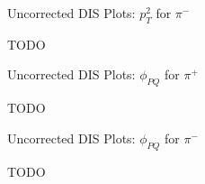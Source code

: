 \begin{frame}{Uncorrected DIS Plots: $p_T^2$ for $\pi^-$}
    \label{20.10f::pt2_pi-}

    TODO

\end{frame}

\begin{frame}{Uncorrected DIS Plots: $\phi_{PQ}$ for $\pi^+$}
    \label{20.10g::phipq_pi+}

    TODO

\end{frame}

\begin{frame}{Uncorrected DIS Plots: $\phi_{PQ}$ for $\pi^-$}
    \label{20.10h::phipq_pi-}

    TODO

\end{frame}
